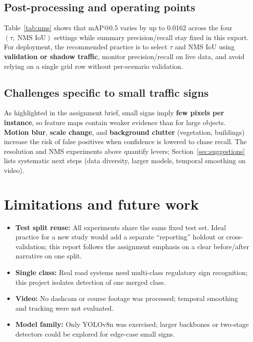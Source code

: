 \documentclass[11pt,a4paper]{article}
\begin{document}
\subsection{Post-processing and operating points}
Table~\ref{tab:nms} shows that mAP@0.5 varies by up to \num{0.0162} across the four $(\tau,\ \text{NMS IoU})$ settings while summary precision/recall stay fixed in this export. For deployment, the recommended practice is to select $\tau$ and NMS IoU using \textbf{validation or shadow traffic}, monitor precision/recall on live data, and avoid relying on a single grid row without per-scenario validation.

\subsection{Challenges specific to small traffic signs}
As highlighted in the assignment brief, small signs imply \textbf{few pixels per instance}, so feature maps contain weaker evidence than for large objects. \textbf{Motion blur}, \textbf{scale change}, and \textbf{background clutter} (vegetation, buildings) increase the risk of false positives when confidence is lowered to chase recall. The resolution and NMS experiments above quantify levers; Section~\ref{sec:suggestions} lists systematic next steps (data diversity, larger models, temporal smoothing on video).

\section{Limitations and future work}
\label{sec:limitations}

\begin{itemize}[leftmargin=*]
  \item \textbf{Test split reuse:} All experiments share the same fixed test set. Ideal practice for a new study would add a separate ``reporting'' holdout or cross-validation; this report follows the assignment emphasis on a clear before/after narrative on one split.
  \item \textbf{Single class:} Real road systems need multi-class regulatory sign recognition; this project isolates detection of one merged class.
  \item \textbf{Video:} No dashcam or course footage was processed; temporal smoothing and tracking were not evaluated.
  \item \textbf{Model family:} Only YOLOv8n was exercised; larger backbones or two-stage detectors could be explored for edge-case small signs.
\end{itemize}
\end{document}
